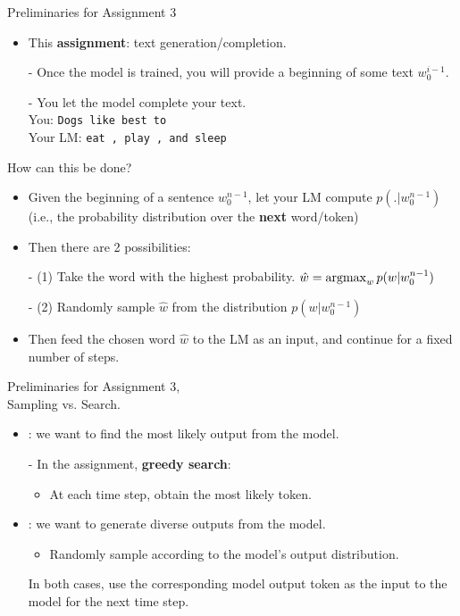 \begin{frame}{Preliminaries for Assignment 3}
\begin{itemize}
\item This \textbf{assignment}: text generation/completion.\\
\item[-] Once the model is trained, you will provide a beginning of some text $w_0^{i-1}$.
\item[-] You let the model complete your text.\\
You: \texttt{Dogs like best to}\\
Your LM: \texttt{eat , play , and sleep}
\end{itemize}
\vsp
\pause
How can this be done?
\pause
\begin{itemize}
\item Given the beginning of a sentence $w_0^{n-1}$,
let your LM compute $p(. | w_0^{n-1})$ (i.e., the probability distribution over the \textbf{next} word/token)
\item Then there are 2 possibilities:
\item[-] (1) Take the word with the highest probability. $\hat{w} = \operatorname{argmax}_w p(w | w_0^{n-1})$
\item[-] (2) Randomly sample $\hat{w}$ from the distribution $p(w | w_0^{n-1})$
\item Then feed the chosen word $\hat{w}$ to the LM as an input, and continue for a fixed number of steps.
\end{itemize}
\end{frame}

\begin{frame}{Preliminaries for Assignment 3,\\
Sampling vs. Search.}
\begin{itemize}
\item {}: we want to find the most likely output from the model.
\item[-] In the assignment, \textbf{greedy search}:
\begin{itemize}
\item At each time step, obtain the most likely token.
\end{itemize}
\item {}: we want to generate diverse outputs from the model.
\begin{itemize}
\item Randomly sample according to the model's output distribution.
\end{itemize}
In both cases, use the corresponding model output token as the input to the model for the next time step.
\end{itemize}
\end{frame}

